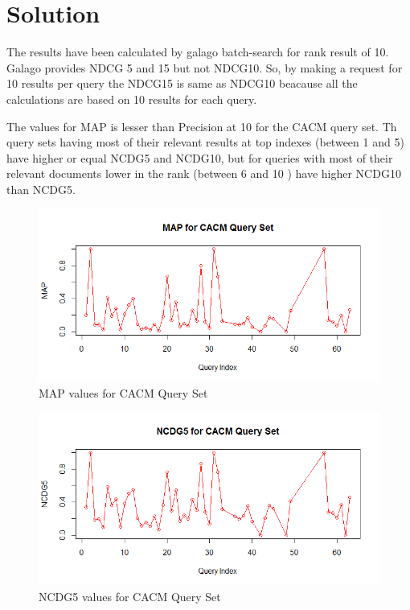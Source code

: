 \documentclass[12pt]{report}
\begin{document}
\section{Solution}
The results have been calculated by galago batch-search for rank result of 10. Galago provides NDCG 5 and 15 but not NDCG10. So, by making a request for 10 results per query the NDCG15 is same as NDCG10 beacause all the calculations are based on 10 results for each query.

The values for MAP is lesser than Precision at 10 for the CACM query set. Th query sets having most of their relevant results at top indexes (between 1 and 5) have higher or equal NCDG5 and NCDG10, but for queries with most of their relevant documents lower in the rank (between 6 and 10 ) have higher NCDG10 than NCDG5. 
\begin{figure}[ht]
  \centering
  \includegraphics[width=1\textwidth]{Problem8_5/MAP.png}
  \caption{MAP values for CACM Query Set}
  \label{fig:1}
\end{figure}

\begin{figure}[ht]
  \centering
  \includegraphics[width=1\textwidth]{Problem8_5/NCDG5.png}
  \caption{NCDG5 values for CACM Query Set}
  \label{fig:1}
\end{figure}
\end{document}
